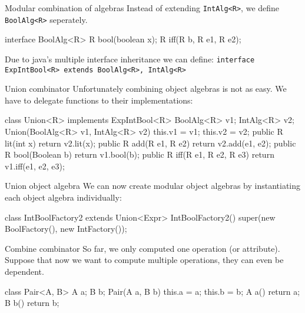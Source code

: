 \documentclass[10pt, compress]{beamer}
\newcommand{\inlinecode}[2]{\colorbox{backg}{\scriptsize{\texttt{#2}}}}
\newenvironment{slide}[1]{\begin{frame}[fragile,environment=slide]{#1}}{\end{frame}}
\newenvironment{slide}[2]{\begin{frame}[fragile,environment=slide]{#1}{#2}}{\end{frame}}
\begin{document}
\begin{slide}{Modular combination of algebras}
Instead of extending \inlinecode{java}{IntAlg<R>}, we define \inlinecode{java}{BoolAlg<R>} seperately.
\begin{java}
interface BoolAlg<R> {
  R bool(boolean x);
  R iff(R b, R e1, R e2);
}
\end{java}
Due to java's multiple interface inheritance we can define:
\inlinecode{java}{interface ExpIntBool<R> extends BoolAlg<R>, IntAlg<R> {}}
\end{slide}

\begin{slide}{Union combinator}
Unfortunately combining object algebras is not as easy.
We have to delegate functions to their implementations:
\begin{java}
class Union<R> implements ExpIntBool<R> {
  BoolAlg<R> v1;
  IntAlg<R> v2;
  Union(BoolAlg<R> v1, IntAlg<R> v2) { this.v1 = v1; this.v2 = v2; }
  public R lit(int x) { return v2.lit(x); }
  public R add(R e1, R e2) { return v2.add(e1, e2); }
  public R bool(Boolean b) { return v1.bool(b); }
  public R iff(R e1, R e2, R e3) { return v1.iff(e1, e2, e3); }
}
\end{java}
\end{slide}
\begin{slide}{Union object algebra}
We can now create modular object algebras by instantiating each object algebra individually:

\begin{java}
class IntBoolFactory2 extends Union<Expr> {
  IntBoolFactory2() { super(new BoolFactory(), new IntFactory()); }
}
\end{java}
\end{slide}

\begin{slide}{Combine combinator}
So far, we only computed one operation (or attribute).
Suppose that now we want to compute multiple operations, they can even be dependent.
\begin{java}
class Pair<A, B> {
  A a; B b;
  Pair(A a, B b) { this.a = a; this.b = b; }
  A a() { return a; }
  B b() { return b; }
}
\end{java}
\end{slide}
\end{document}
